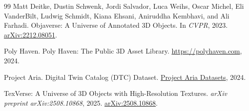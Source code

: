 \documentclass[11pt]{article}
\begin{document}
\begin{thebibliography}{99}
  Matt Deitke, Dustin Schwenk, Jordi Salvador, Luca Weihs, Oscar Michel, Eli VanderBilt, Ludwig Schmidt, Kiana Ehsani, Aniruddha Kembhavi, and Ali Farhadi.
  \newblock Objaverse: A Universe of Annotated 3D Objects.
  \newblock In \emph{CVPR}, 2023.
  \newblock \href{https://arxiv.org/abs/2212.08051}{arXiv:2212.08051}.

  Poly Haven.
  \newblock Poly Haven: The Public 3D Asset Library.
  \newblock \href{https://polyhaven.com}{https://polyhaven.com}, 2024.

  Project Aria.
  \newblock Digital Twin Catalog (DTC) Dataset.
  \newblock \href{https://www.projectaria.com/datasets/dtc/}{Project Aria Datasets}, 2024.

  TexVerse: A Universe of 3D Objects with High-Resolution Textures.
  \newblock \emph{arXiv preprint arXiv:2508.10868}, 2025.
  \newblock \href{https://arxiv.org/abs/2508.10868}{arXiv:2508.10868}.
\end{thebibliography}
\end{document}
